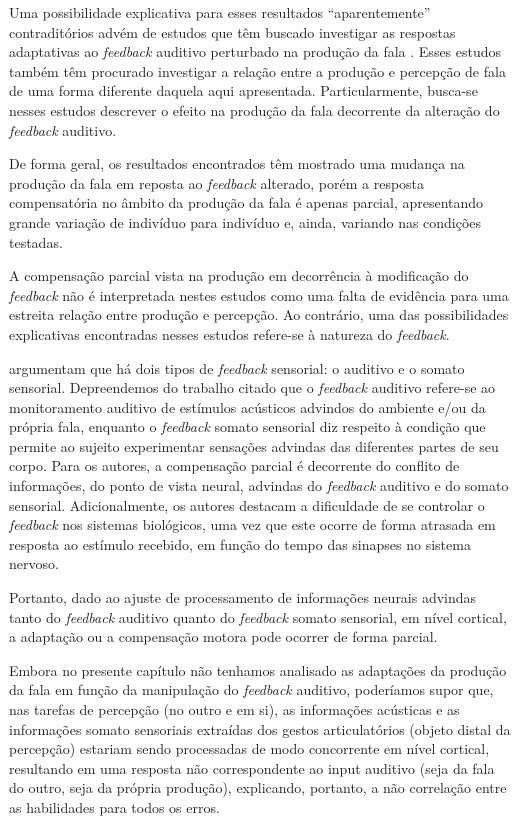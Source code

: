 \documentclass[output=paper,colorlinks,citecolor=brown,booklanguage=portuguese]{langscibook}
\begin{document}
Uma possibilidade explicativa para esses resultados “aparentemente” contraditórios advém de estudos que têm buscado investigar as respostas adaptativas ao \emph{feedback} auditivo perturbado na produção da fala \citep{Shiller2010, Casserly2011, Chang2013, Boer2017}. Esses estudos também têm procurado investigar a relação entre a produção e percepção de fala de uma forma diferente daquela aqui apresentada. Particularmente, busca-se nesses estudos descrever o efeito na produção da fala decorrente da alteração do \emph{feedback} auditivo.

De forma geral, os resultados encontrados têm mostrado uma mudança na produção da fala em reposta ao \emph{feedback} alterado, porém a resposta compensatória no âmbito da produção da fala é apenas parcial, apresentando grande variação de indivíduo para indivíduo e, ainda, variando nas condições testadas.

A compensação parcial vista na produção em decorrência à modificação do \emph{feedback} não é interpretada nestes estudos como uma falta de evidência para uma estreita relação entre produção e percepção. Ao contrário, uma das possibilidades explicativas encontradas nesses estudos refere-se à natureza do \emph{feedback}.

\citet{Chang2013} argumentam que há dois tipos de \emph{feedback} sensorial: o auditivo e o somato sensorial. Depreendemos do trabalho citado que o \emph{feedback} auditivo refere-se ao monitoramento auditivo de estímulos acústicos advindos do ambiente e/ou da própria fala, enquanto o \emph{feedback} somato sensorial diz respeito à condição que permite ao sujeito experimentar sensações advindas das diferentes partes de seu corpo. Para os autores, a compensação parcial é decorrente do conflito de informações, do ponto de vista neural, advindas do \emph{feedback} auditivo e do somato sensorial. Adicionalmente, os autores destacam a dificuldade de se controlar o \emph{feedback} nos sistemas biológicos, uma vez que este ocorre de forma atrasada em resposta ao estímulo recebido, em função do tempo das sinapses no sistema nervoso.

Portanto, dado ao ajuste de processamento de informações neurais advindas tanto do \emph{feedback} auditivo quanto do \emph{feedback} somato sensorial, em nível cortical, a adaptação ou a compensação motora pode ocorrer de forma parcial.

Embora no presente capítulo não tenhamos analisado as adaptações da produção da fala em função da manipulação do \emph{feedback} auditivo, poderíamos supor que, nas tarefas de percepção (no outro e em si), as informações acústicas e as informações somato sensoriais extraídas dos gestos articulatórios (objeto distal da percepção) estariam sendo processadas de modo concorrente em nível cortical, resultando em uma resposta não correspondente ao input auditivo (seja da fala do outro, seja da própria produção), explicando, portanto, a não correlação entre as habilidades para todos os erros.
\end{document}
